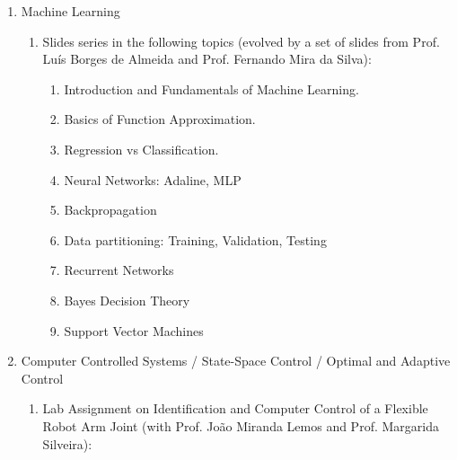 \begin{enumerate}
\begin{enumerate}
    \begin{enumerate}
    \def\labelenumiii{\roman{enumiii}.}
    \item
      Physical modelling and Matlab simulation.
    \item
      Parametric Identification from Step Response.
    \item
      Determination of Control
    \item
      Parametric Identification from data: ARX and ARMAX models.
    \item
      Polynomial Control with two degrees of freedom.
    \item
      Cascaded Control
    \item
      Adaptative Control
    \end{enumerate}
  \end{enumerate}
\item
  Machine Learning

  \begin{enumerate}
  \def\labelenumii{\alph{enumii}.}
  \item
    Slides series in the following topics (evolved by a set of slides
    from Prof. Luís Borges de Almeida and Prof. Fernando Mira da Silva):

    \begin{enumerate}
    \def\labelenumiii{\roman{enumiii}.}
    \item
      Introduction and Fundamentals of Machine Learning.
    \item
      Basics of Function Approximation.
    \item
      Regression vs Classification.
    \item
      Neural Networks: Adaline, MLP
    \item
      Backpropagation
    \item
      Data partitioning: Training, Validation, Testing
    \item
      Recurrent Networks
    \item
      Bayes Decision Theory
    \item
      Support Vector Machines
    \end{enumerate}
  \end{enumerate}
\item
  Computer Controlled Systems / State-Space Control / Optimal and
  Adaptive Control

  \begin{enumerate}
  \def\labelenumii{\alph{enumii}.}
  \item
    Lab Assignment on Identification and Computer Control of a Flexible
    Robot Arm Joint (with Prof. João Miranda Lemos and Prof. Margarida
    Silveira):


\end{enumerate}
\end{enumerate}
